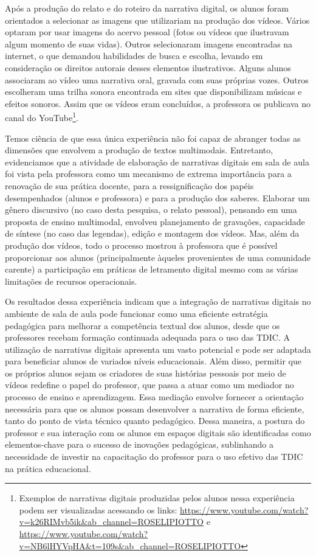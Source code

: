 \documentclass[portuguese]{textolivre}
\begin{document}
Após a produção do relato e do roteiro da narrativa digital, os alunos foram orientados a selecionar as imagens que utilizariam na produção dos vídeos. Vários optaram por usar imagens do acervo pessoal (fotos ou vídeos que ilustravam algum momento de suas vidas). Outros selecionaram imagens encontradas na internet, o que demandou habilidades de busca e escolha, levando em consideração os direitos autorais desses elementos ilustrativos. Alguns alunos associaram ao vídeo uma narrativa oral, gravada com suas próprias vozes. Outros escolheram uma trilha sonora encontrada em sites que disponibilizam músicas e efeitos sonoros. Assim que os vídeos eram concluídos, a professora os publicava no canal do YouTube\footnote{Exemplos de narrativas digitais produzidas pelos alunos nessa experiência podem ser visualizadas acessando os links: \url{https://www.youtube.com/watch?v=k26RIMvb5ik&ab_channel=ROSELIPIOTTO} e \url{https://www.youtube.com/watch?v=NB6lHYVpHA&t=109s&ab_channel=ROSELIPIOTTO}}.

Temos ciência de que essa única experiência não foi capaz de abranger todas as dimensões que envolvem a produção de textos multimodais. Entretanto, evidenciamos que a atividade de elaboração de narrativas digitais em sala de aula foi vista pela professora como um mecanismo de extrema importância para a renovação de sua prática docente, para a ressignificação dos papéis desempenhados (alunos e professora) e para a produção dos saberes. Elaborar um gênero discursivo (no caso desta pesquisa, o relato pessoal), pensando em uma proposta de ensino multimodal, envolveu planejamento de gravações, capacidade de síntese (no caso das legendas), edição e montagem dos vídeos. Mas, além da produção dos vídeos, todo o processo mostrou à professora que é possível proporcionar aos alunos (principalmente àqueles provenientes de uma comunidade carente) a participação em práticas de letramento digital mesmo com as várias limitações de recursos operacionais.

Os resultados dessa experiência indicam que a integração de narrativas digitais no ambiente de sala de aula pode funcionar como uma eficiente estratégia pedagógica para melhorar a competência textual dos alunos, desde que os professores recebam formação continuada adequada para o uso das TDIC. A utilização de narrativas digitais apresenta um vasto potencial e pode ser adaptada para beneficiar alunos de variados níveis educacionais. Além disso, permitir que os próprios alunos sejam os criadores de suas histórias pessoais por meio de vídeos redefine o papel do professor, que passa a atuar como um mediador no processo de ensino e aprendizagem. Essa mediação envolve fornecer a orientação necessária para que os alunos possam desenvolver a narrativa de forma eficiente, tanto do ponto de vista técnico quanto pedagógico. Dessa maneira, a postura do professor e sua interação com os alunos em espaços digitais são identificadas como elementos-chave para o sucesso de inovações pedagógicas, sublinhando a necessidade de investir na capacitação do professor para o uso efetivo das TDIC na prática educacional.
\end{document}
